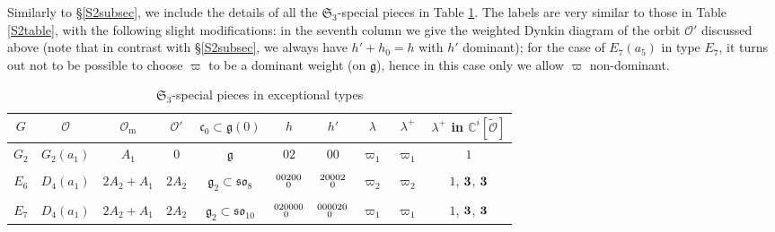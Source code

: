 \documentclass{amsart}
\theoremstyle{definition}
\newcommand{\C}{\mathbb{C}}
\newcommand{\m}{\mathrm{m}}
\newcommand{\g}{\mathfrak{g}}
\newcommand{\0}{\mathcal{O}}
\begin{document}
Similarly to \S \ref{S2subsec}, we include the details of all the $\mathfrak{S}_3$-special pieces in Table \ref{S3table}.
The labels are very similar to those in Table \ref{S2table}, with the following slight modifications: in the seventh column we give the weighted Dynkin diagram of the orbit $\0'$ discussed above (note that in contrast with \S \ref{S2subsec}, we always have $h'+h_0=h$ with $h'$ dominant); for the case of $E_7(a_5)$ in type $E_7$, it turns out not to be possible to choose $\varpi$ to be a dominant weight (on $\g$), hence in this case only we allow $\varpi$ non-dominant.



\begin{table}[htp] 
	\caption{$\mathfrak{S}_3$-special pieces in exceptional types}\label{S3table}
\begin{center}
\begin{tabular}{|c | c| c| c| c| c| c| c| c| c|}
\hline
$G$ & $\0$ & $\0_\m$ & $\0'$ & $\mathfrak{c}_0\subset {\mathfrak g}(0)$ & $h$ & $h'$ 
& $\lambda$ & $\lambda^+$ 
& $\lambda^+$ in $\C^i[\widetilde{\0}]$ \\
\hline 
$G_2$ & $G_2(a_1)$ & $A_1$ & $0$ & $\g$ & $02$ & $00$ 
& $\varpi_1$ & $\varpi_1$ 
& $1$ \\

\hline & & & & & & &  & & \\[-0.3cm]

$E_6$ & $D_4(a_1)$ & $2A_2+A_1$ & $2A_2$ & $\g_2\subset\mathfrak{so}_8$ & $\scriptsize{\begin{aligned}00 &200 \\[-1.8mm] &0\end{aligned}}$ & $\scriptsize{\begin{aligned}20 &002 \\[-1.8mm] &0\end{aligned}}$ 
& $\varpi_2$ & $\varpi_2$ 
& $1$, ${\bf 3}$, ${\bf 3}$ \\

\hline & & & & & & &  & & \\[-0.3cm]

$E_7$ & $D_4(a_1)$ & $2A_2+A_1$ & $2A_2$ & $\g_2\subset\mathfrak{so}_{10}$ & $\scriptsize{\begin{aligned}02 &0000 \\[-1.8mm] &0\end{aligned}}$ & $\scriptsize{\begin{aligned}00 &0020 \\[-1.8mm] &0\end{aligned}}$ 
& $\varpi_1$ & $\varpi_1$ 
& $1$, ${\bf 3}$, ${\bf 3}$ \\


\end{tabular}
\end{center}
\end{table}
\end{document}
